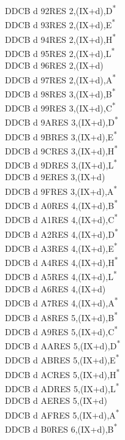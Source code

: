 \documentclass[oneside,a4paper]{book}
\begin{document}
\begin{multicols}{3}
{\begin{tabbing}
DDCB d 92\>RES 2,(IX+d),D\textsuperscript{*}\\
DDCB d 93\>RES 2,(IX+d),E\textsuperscript{*}\\
DDCB d 94\>RES 2,(IX+d),H\textsuperscript{*}\\
DDCB d 95\>RES 2,(IX+d),L\textsuperscript{*}\\
DDCB d 96\>RES 2,(IX+d)\\
DDCB d 97\>RES 2,(IX+d),A\textsuperscript{*}\\
DDCB d 98\>RES 3,(IX+d),B\textsuperscript{*}\\
DDCB d 99\>RES 3,(IX+d),C\textsuperscript{*}\\
DDCB d 9A\>RES 3,(IX+d),D\textsuperscript{*}\\
DDCB d 9B\>RES 3,(IX+d),E\textsuperscript{*}\\
DDCB d 9C\>RES 3,(IX+d),H\textsuperscript{*}\\
DDCB d 9D\>RES 3,(IX+d),L\textsuperscript{*}\\
DDCB d 9E\>RES 3,(IX+d)\\
DDCB d 9F\>RES 3,(IX+d),A\textsuperscript{*}\\
DDCB d A0\>RES 4,(IX+d),B\textsuperscript{*}\\
DDCB d A1\>RES 4,(IX+d),C\textsuperscript{*}\\
DDCB d A2\>RES 4,(IX+d),D\textsuperscript{*}\\
DDCB d A3\>RES 4,(IX+d),E\textsuperscript{*}\\
DDCB d A4\>RES 4,(IX+d),H\textsuperscript{*}\\
DDCB d A5\>RES 4,(IX+d),L\textsuperscript{*}\\
DDCB d A6\>RES 4,(IX+d)\\
DDCB d A7\>RES 4,(IX+d),A\textsuperscript{*}\\
DDCB d A8\>RES 5,(IX+d),B\textsuperscript{*}\\
DDCB d A9\>RES 5,(IX+d),C\textsuperscript{*}\\
DDCB d AA\>RES 5,(IX+d),D\textsuperscript{*}\\
DDCB d AB\>RES 5,(IX+d),E\textsuperscript{*}\\
DDCB d AC\>RES 5,(IX+d),H\textsuperscript{*}\\
DDCB d AD\>RES 5,(IX+d),L\textsuperscript{*}\\
DDCB d AE\>RES 5,(IX+d)\\
DDCB d AF\>RES 5,(IX+d),A\textsuperscript{*}\\
DDCB d B0\>RES 6,(IX+d),B\textsuperscript{*}\\

\end{tabbing}}
\end{multicols}
\end{document}
